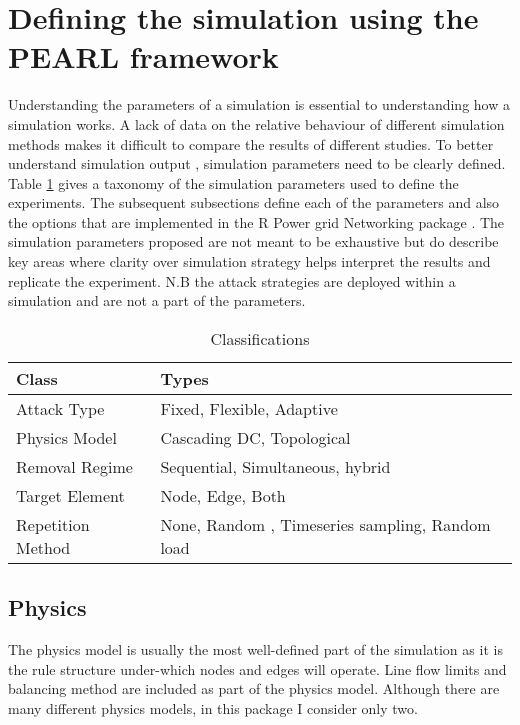 \section{Defining the simulation using the PEARL framework}  
\label{sect:PEARL}
Understanding the parameters of a simulation is essential to understanding how a simulation works. A lack of data on the relative behaviour of different simulation methods makes it difficult to compare the results of different studies. To better understand simulation output , simulation parameters need to be clearly defined. Table \ref{tab:SimuParamsABS} gives a taxonomy of the simulation parameters used to define the experiments. The subsequent subsections define each of the parameters and also the options that are implemented in the R Power grid Networking package \cite{JonathanBourne2018a}. The simulation parameters proposed are not meant to be exhaustive but do describe key areas where clarity over simulation strategy helps interpret the results and replicate the experiment.  N.B the attack strategies are deployed within a simulation and are not a part of the parameters.

    
\begin{table}[ht]
\centering
\caption{Classifications}
\label{tab:SimuParamsABS}
\begin{tabular}{l|l}
Class        & Types                     \\ \hline
Attack Type  & Fixed, Flexible, Adaptive \\
Physics Model      & Cascading DC, Topological \\
Removal Regime     & Sequential, Simultaneous, hybrid  \\
Target Element      & Node, Edge, Both        \\
Repetition Method & None, Random , Timeseries sampling, Random load        
\end{tabular}
\end{table}

\subsection{Physics}

The physics model is usually the most well-defined part of the simulation as it is the rule structure under-which nodes and edges will operate. Line flow limits and balancing method are included as part of the physics model. Although there are many different physics models, in this package I consider only two.

